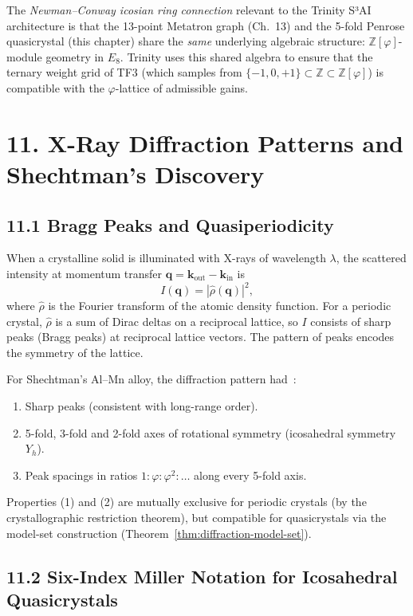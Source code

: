 The \emph{Newman--Conway icosian ring connection}
relevant to the Trinity S³AI architecture is that
the 13-point Metatron graph (Ch.~13) and the
5-fold Penrose quasicrystal (this chapter) share
the \emph{same} underlying algebraic structure:
\(\mathbb{Z}[\varphi]\)-module geometry in
\(E_8\). Trinity uses this shared algebra to
ensure that the ternary weight grid of TF3 (which
samples from \(\{-1,0,+1\} \subset \mathbb{Z}
\subset \mathbb{Z}[\varphi]\)) is compatible with
the \(\varphi\)-lattice of admissible gains.

\section{11. X-Ray Diffraction Patterns and
Shechtman's Discovery}\label{sec:diffraction}

\subsection{11.1 Bragg Peaks and Quasiperiodicity}
\label{sec:bragg}

When a crystalline solid is illuminated with
X-rays of wavelength \(\lambda\), the scattered
intensity at momentum transfer
\(\mathbf{q} = \mathbf{k}_\text{out} - \mathbf{k}_\text{in}\)
is
\[
  I(\mathbf{q}) = |\hat{\rho}(\mathbf{q})|^2,
\]
where \(\hat{\rho}\) is the Fourier transform of
the atomic density function. For a periodic
crystal, \(\hat{\rho}\) is a sum of Dirac deltas
on a reciprocal lattice, so \(I\) consists of
sharp peaks (Bragg peaks) at reciprocal lattice
vectors. The pattern of peaks encodes the symmetry
of the lattice.

For Shechtman's Al--Mn alloy, the diffraction
pattern had~\cite{shechtman1984}:
\begin{enumerate}
  \item Sharp peaks (consistent with long-range
        order).
  \item 5-fold, 3-fold and 2-fold axes of
        rotational symmetry (icosahedral symmetry
        \(Y_h\)).
  \item Peak spacings in ratios
        \(1 : \varphi : \varphi^2 : \ldots\) along
        every 5-fold axis.
\end{enumerate}
Properties (1) and (2) are mutually exclusive for
periodic crystals (by the crystallographic
restriction theorem), but compatible for
quasicrystals via the model-set construction
(Theorem~\ref{thm:diffraction-model-set}).

\subsection{11.2 Six-Index Miller Notation for
Icosahedral Quasicrystals}\label{sec:miller}

